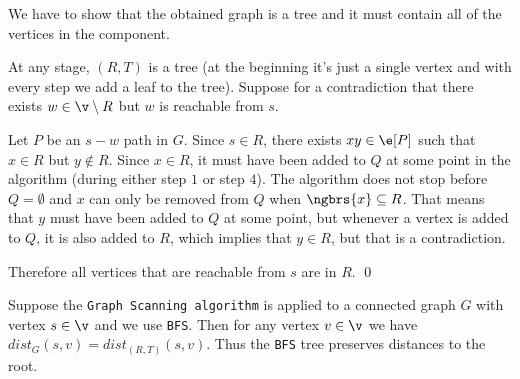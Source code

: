 \begin{prf}
    We have to show that the obtained graph is a tree and it must contain all of the vertices in the component.

    At any stage, $(R, T)$ is a tree (at the beginning it's just a single vertex and with every step we add a leaf to the tree). Suppose for a contradiction that there exists $w \in \v \setminus R$ but $w$ is reachable from $s$.

    Let $P$ be an $s - w$ path in $G$. Since $s \in R$, there exists $xy \in \e[P]$ such that $x \in R$ but $y \notin R$. Since $x \in R$, it must have been added to $Q$ at some point in the algorithm (during either step $1$ or step $4$). The algorithm does not stop before $Q = \emptyset$ and $x$ can only be removed from $Q$ when $\ngbrs{x} \subseteq R$. That means that $y$ must have been added to $Q$ at some point, but whenever a vertex is added to $Q$, it is also added to $R$, which implies that $y \in R$, but that is a contradiction.

    Therefore all vertices that are reachable from $s$ are in $R$. \qed
\end{prf}
\begin{customlemma}{1.19}
    \label{lemma:1.19}
    Suppose the \texttt{Graph Scanning algorithm} is applied to a connected graph $G$ with vertex $s \in \v$ and we use \texttt{BFS}. Then for any vertex $v \in \v$ we have $dist_G(s, v) = dist_{(R, T)}(s, v)$. Thus the \texttt{BFS} tree preserves distances to the root.
\end{customlemma}
